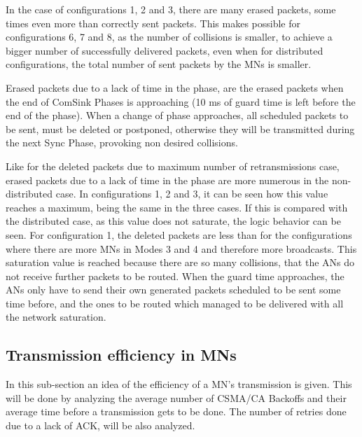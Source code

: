 In the case of configurations 1, 2 and 3, there are many erased packets, some times even more than correctly sent packets. This makes possible 
for configurations 6, 7 and 8, as the number of collisions is smaller, to achieve a bigger number of successfully delivered packets, even 
when for distributed configurations, the total number of sent packets by the \acp{MN} is smaller.

Erased packets due to a lack of time in the phase, are the erased packets when the end of ComSink Phases is approaching (10 ms of guard time is left
before the end of the phase). When a change of phase approaches, all scheduled packets to be sent, must be deleted or postponed, otherwise they will be 
transmitted during the next Sync Phase, provoking non desired collisions.

Like for the deleted packets due to maximum number of retransmissions case, erased packets due to a lack of time in the phase are more numerous in the 
non-distributed case. In configurations 1, 2 and 3, it can be seen how this value reaches a maximum, being the same in the three cases. If this 
is compared with the distributed case, as this value does not saturate, the logic behavior can be seen. For configuration 1, the deleted packets 
are less than for the configurations where there are more \acp{MN} in Modes 3 and 4 and therefore more broadcasts. This saturation value is reached 
because there are so many collisions, that the \acp{AN} do not receive further packets to be routed. When the guard time approaches, the \acp{AN} only have 
to send their own generated packets scheduled to be sent some time before, and the ones to be routed which managed to be delivered with all the 
network saturation.

\subsection{Transmission efficiency in \acp{MN}}

In this sub-section an idea of the efficiency of a \ac{MN}'s transmission is given. This will be done by analyzing the average number of \ac{CSMA/CA}
Backoffs and their average time before a transmission gets to be done. The number of retries done due to a lack of \ac{ACK}, will be also analyzed.

